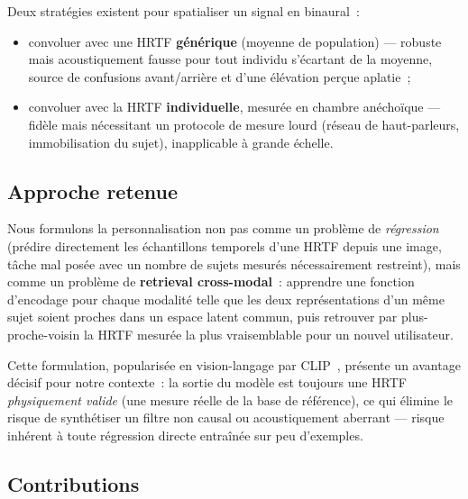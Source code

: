 \documentclass[12pt, a4paper]{article}
\begin{document}
Deux stratégies existent pour spatialiser un signal en binaural~:

\begin{itemize}
    \item convoluer avec une HRTF \textbf{générique} (moyenne de population)
    — robuste mais acoustiquement fausse pour tout individu s'écartant de
    la moyenne, source de confusions avant/arrière et d'une élévation
    perçue aplatie~;
    \item convoluer avec la HRTF \textbf{individuelle}, mesurée en chambre
    anéchoïque — fidèle mais nécessitant un protocole de mesure lourd
    (réseau de haut-parleurs, immobilisation du sujet), inapplicable à
    grande échelle.
\end{itemize}

\subsection{Approche retenue}

Nous formulons la personnalisation non pas comme un problème de
\emph{régression} (prédire directement les échantillons temporels d'une
HRTF depuis une image, tâche mal posée avec un nombre de sujets mesurés
nécessairement restreint), mais comme un problème de \textbf{retrieval
cross-modal}~: apprendre une fonction d'encodage pour chaque modalité telle
que les deux représentations d'un même sujet soient proches dans un espace
latent commun, puis retrouver par plus-proche-voisin la HRTF mesurée la
plus vraisemblable pour un nouvel utilisateur.

Cette formulation, popularisée en vision-langage par CLIP~\cite{Radford21},
présente un avantage décisif pour notre contexte~: la sortie du modèle est
toujours une HRTF \emph{physiquement valide} (une mesure réelle de la base
de référence), ce qui élimine le risque de synthétiser un filtre non
causal ou acoustiquement aberrant — risque inhérent à toute régression
directe entraînée sur peu d'exemples.

\subsection{Contributions}
\end{document}
